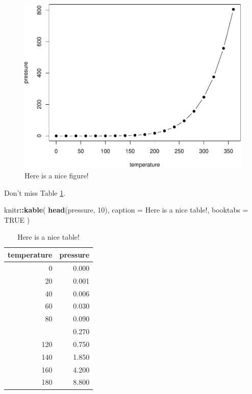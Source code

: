 \documentclass[
]{book}
\newenvironment{Shaded}{\begin{snugshade}}{\end{snugshade}}
\newcommand{\AttributeTok}[1]{\textcolor[rgb]{0.13,0.29,0.53}{#1}}
\newcommand{\ConstantTok}[1]{\textcolor[rgb]{0.56,0.35,0.01}{#1}}
\newcommand{\DecValTok}[1]{\textcolor[rgb]{0.00,0.00,0.81}{#1}}
\newcommand{\FunctionTok}[1]{\textcolor[rgb]{0.13,0.29,0.53}{\textbf{#1}}}
\newcommand{\NormalTok}[1]{#1}
\newcommand{\SpecialCharTok}[1]{\textcolor[rgb]{0.81,0.36,0.00}{\textbf{#1}}}
\newcommand{\StringTok}[1]{\textcolor[rgb]{0.31,0.60,0.02}{#1}}
\theoremstyle{definition}
\theoremstyle{definition}
\theoremstyle{definition}
\theoremstyle{definition}
\theoremstyle{remark}
\begin{document}
\begin{figure}

{\centering \includegraphics[width=0.8\linewidth]{meuLivro2_files/figure-latex/nice-fig-1} 

}

\caption{Here is a nice figure!}\label{fig:nice-fig}
\end{figure}

Don't miss Table \ref{tab:nice-tab}.

\begin{Shaded}
\begin{Highlighting}[]
\NormalTok{knitr}\SpecialCharTok{::}\FunctionTok{kable}\NormalTok{(}
  \FunctionTok{head}\NormalTok{(pressure, }\DecValTok{10}\NormalTok{), }\AttributeTok{caption =} \StringTok{\textquotesingle{}Here is a nice table!\textquotesingle{}}\NormalTok{,}
  \AttributeTok{booktabs =} \ConstantTok{TRUE}
\NormalTok{)}
\end{Highlighting}
\end{Shaded}

\begin{table}

\caption{\label{tab:nice-tab}Here is a nice table!}
\centering
\begin{tabular}[t]{rr}
\toprule
temperature & pressure\\
\midrule
0 & 0.000\\
20 & 0.001\\
40 & 0.006\\
60 & 0.030\\
80 & 0.090\\
\addlinespace
100 & 0.270\\
120 & 0.750\\
140 & 1.850\\
160 & 4.200\\
180 & 8.800\\
\bottomrule
\end{tabular}
\end{table}
\end{document}

